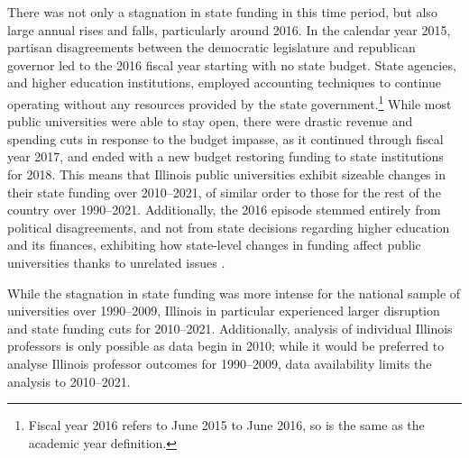 There was not only a stagnation in state funding in this time period, but also large annual rises and falls, particularly around 2016.
In the calendar year 2015, partisan disagreements between the democratic legislature and republican governor led to the 2016 fiscal year starting with no state budget.
State agencies, and higher education institutions, employed accounting techniques to continue operating without any resources provided by the state government.\footnote{
    Fiscal year 2016 refers to June 2015 to June 2016, so is the same as the academic year definition.
}
While most public universities were able to stay open, there were drastic revenue and spending cuts in response to the budget impasse, as it continued through fiscal year 2017, and ended with a new budget restoring funding to state institutions for 2018.
This means that Illinois public universities exhibit sizeable changes in their state funding over 2010--2021, of similar order to those for the rest of the country over 1990--2021.
Additionally, the 2016 episode stemmed entirely from political disagreements, and not from state decisions regarding higher education and its finances, exhibiting how state-level changes in funding affect public universities thanks to unrelated issues \citep{young2020squandered}.

While the stagnation in state funding was more intense for the national sample of universities over 1990--2009, Illinois in particular experienced larger disruption and state funding cuts for 2010--2021.
Additionally, analysis of individual Illinois professors is only possible as data begin in 2010; while it would be preferred to analyse Illinois professor outcomes for 1990--2009, data availability limits the analysis to 2010--2021.
